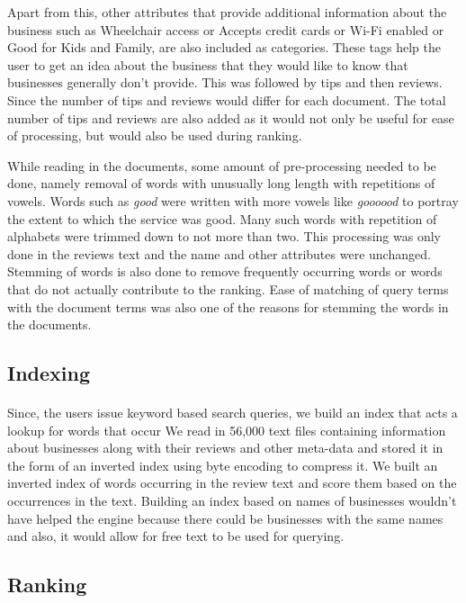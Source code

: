 \documentclass{article} %
\begin{document}
Apart from this, other attributes that provide additional information about the business such as Wheelchair access or Accepts credit cards or Wi-Fi enabled or Good for Kids and Family, are also included as categories. These tags help the user to get an idea about the business that they would like to know that businesses generally don't provide.
This was followed by tips and then reviews. Since the number of tips and reviews would differ for each document. The total number of tips and reviews are also added as it would not only be useful for ease of processing, but would also be used during ranking.  

While reading in the documents, some amount of pre-processing needed to be done, namely removal of words with unusually long length with repetitions of vowels. Words such as \textit{good} were written with more vowels like \textit{goooood} to portray the extent to which the service was good. Many such words with repetition of alphabets were trimmed down to not more than two. This processing was only done in the reviews text and the name and other attributes were unchanged. Stemming of words is also done to remove frequently occurring words or words that do not actually contribute to the ranking. Ease of matching of query terms with the document terms was also one of the reasons for stemming the words in the documents.


\subsection{Indexing}
\paragraph{}Since, the users issue keyword based search queries, we build an index that acts a lookup for words that occur  We read in 56,000 text files containing information about businesses along with their reviews and other meta-data and stored it in the form of an inverted index using byte encoding to compress it. We built an inverted index of words occurring in the review text and score them based on the occurrences in the text. Building an index based on names of businesses wouldn't have helped the engine because there could be businesses with the same names and also, it would allow for free text to be used for querying.

\subsection{Ranking}
\end{document}
